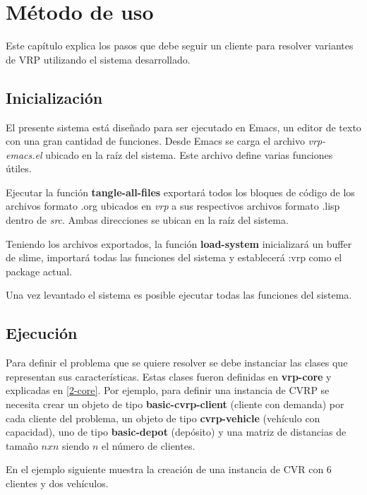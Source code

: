 \chapter{Método de uso}\label{chapter:Tutorial}

Este capítulo explica los pasos que debe seguir un cliente para resolver variantes de VRP utilizando el sistema desarrollado.

\section{Inicialización}
El presente sistema está diseñado para ser ejecutado en Emacs, un editor de texto con una gran cantidad de funciones. Desde Emacs se carga el archivo \textit{vrp-emacs.el} ubicado en la raíz del sistema. Este archivo define varias funciones útiles.

Ejecutar la función \textbf{tangle-all-files} exportará todos los bloques de código de los archivos formato .org ubicados en \textit{vrp} a sus respectivos archivos formato .lisp dentro de \textit{src}. Ambas direcciones se ubican en la raíz del sistema.

Teniendo los archivos exportados, la función \textbf{load-system} inicializará un buffer de slime, importará todas las funciones del sistema y establecerá :vrp como el package actual.

Una vez levantado el sistema es posible ejecutar todas las funciones del sistema.

\section{Ejecución}\label{3-problem}

Para definir el problema que se quiere resolver se debe instanciar las clases que representan sus características. Estas clases fueron definidas en \textbf{vrp-core} y explicadas en \ref{2-core}. Por ejemplo, para definir una instancia de CVRP se necesita crear un objeto de tipo \textbf{basic-cvrp-client} (cliente con demanda) por cada cliente del problema, un objeto de tipo \textbf{cvrp-vehicle} (vehículo con capacidad), uno de tipo \textbf{basic-depot} (depósito) y una matriz de distancias de tamaño $nxn$ siendo $n$ el número de clientes. 

En el ejemplo siguiente muestra la creación de una instancia de CVR con 6 clientes y dos vehículos.

